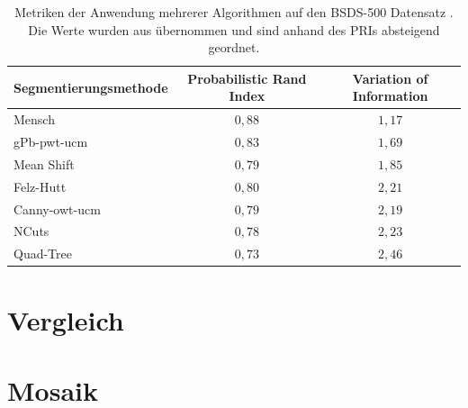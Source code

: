 \begin{table}
	\begin{tabular}{l c c}
		\toprule
		\textbf{Segmentierungsmethode} & \textbf{Probabilistic Rand Index} & \textbf{Variation of Information} \\
		\midrule
		Mensch \cite{bsd500} & $0,88$ & $1,17$ \\
		\midrule
		gPb-pwt-ucm \cite{arbelaez_10} & $0,83$ & $1,69$ \\
		Mean Shift \cite{comaniciu_02} & $0,79$ & $1,85$ \\
		Felz-Hutt \cite{felzenszwalb_04} & $0,80$ & $2,21$ \\
		Canny-owt-ucm \cite{arbelaez_10} & $0,79$ & $2,19$ \\
		NCuts \cite{cour_05} & $0,78$ & $2,23$ \\
		Quad-Tree & $0,73$ & $2,46$ \\
		\bottomrule
	\end{tabular}
	\caption{Metriken der Anwendung mehrerer Algorithmen auf den BSDS-500 Datensatz \cite{bsd500}. Die Werte wurden aus \cite{arbelaez_10} übernommen und sind anhand des PRIs absteigend geordnet.}
	\label{tab:res_bsds500}
\end{table}

\section{Vergleich}
\label{sec:comparision}

\section{Mosaik}
\label{sec:mosaic}